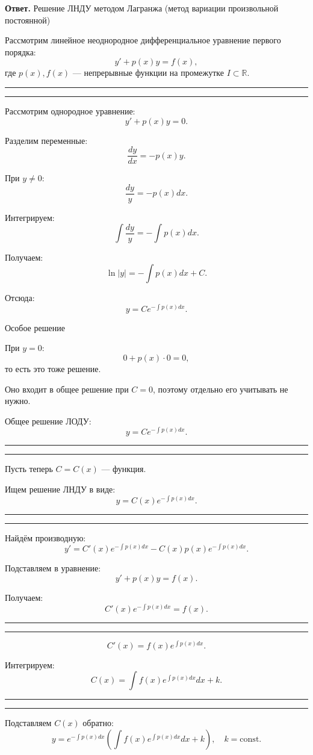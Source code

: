 \documentclass[a4paper,11pt]{article}
\newcommand{\examanswer}[1]{
\begin{answerbox}
\textbf{Ответ.} #1
\end{answerbox}
}
\newcommand{\examstep}[1]{
\par\smallskip
\noindent\textcolor{answercolor}{\rule{\linewidth}{0.4pt}}
\par\vspace{-2pt}
\noindent{\textbf{\textcolor{answercolor}{#1}}}
\par\vspace{-4pt}
\noindent\textcolor{answercolor}{\rule{\linewidth}{0.4pt}}
\par\smallskip
}
\begin{document}
\examanswer{
Решение ЛНДУ методом Лагранжа (метод вариации произвольной постоянной)

Рассмотрим линейное неоднородное дифференциальное уравнение первого порядка:
\[
y'+p(x)y=f(x),
\]
где $p(x),f(x)$ — непрерывные функции на промежутке $I\subset \mathbb{R}$.

\examstep{Шаг 1. Решение соответствующего ЛОДУ}

Рассмотрим однородное уравнение:
\[
y'+p(x)y=0.
\]

Разделим переменные:
\[
\frac{dy}{dx}=-p(x)y.
\]

При $y\neq 0$:
\[
\frac{dy}{y}=-p(x)dx.
\]

Интегрируем:
\[
\int \frac{dy}{y}=-\int p(x)dx.
\]

Получаем:
\[
\ln|y|=-\int p(x)dx+C.
\]

Отсюда:
\[
y=Ce^{-\int p(x)dx}.
\]

Особое решение

При $y=0$:
\[
0+p(x)\cdot 0=0,
\]
то есть это тоже решение.

Оно входит в общее решение при $C=0$, поэтому отдельно его учитывать не нужно.

Общее решение ЛОДУ:
\[
y=Ce^{-\int p(x)dx}.
\]

\examstep{Шаг 2. Вариация постоянной}

Пусть теперь $C=C(x)$ — функция.

Ищем решение ЛНДУ в виде:
\[
y=C(x)e^{-\int p(x)dx}.
\]

\examstep{Шаг 3. Подстановка в исходное уравнение}

Найдём производную:
\[
y'=C'(x)e^{-\int p(x)dx}-C(x)p(x)e^{-\int p(x)dx}.
\]

Подставляем в уравнение:
\[
y'+p(x)y=f(x).
\]

Получаем:
\[
C'(x)e^{-\int p(x)dx}=f(x).
\]

\examstep{Шаг 4. Нахождение $C(x)$}

\[
C'(x)=f(x)e^{\int p(x)dx}.
\]

Интегрируем:
\[
C(x)=\int f(x)e^{\int p(x)dx}dx+k.
\]

\examstep{Итоговое решение ЛНДУ}

Подставляем $C(x)$ обратно:
\[
y=e^{-\int p(x)dx}\left(\int f(x)e^{\int p(x)dx}dx+k\right),\quad k=\mathrm{const}.
\]
}
\end{document}
